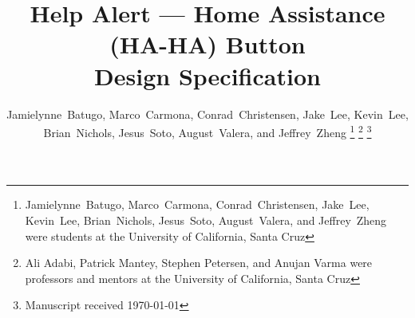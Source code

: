 \documentclass[journal,compsoc]{IEEEtran}
\begin{document}
%
\title{
  Help Alert --- Home Assistance (HA-HA) Button \\
  Design Specification
}
%
%
%

\author{Jamielynne~Batugo, Marco~Carmona, Conrad~Christensen, Jake~Lee, Kevin~Lee, Brian~Nichols, Jesus~Soto, August~Valera, and Jeffrey~Zheng%
  \thanks{Jamielynne~Batugo, Marco~Carmona, Conrad~Christensen, Jake~Lee, Kevin~Lee, Brian~Nichols, Jesus~Soto, August~Valera, and Jeffrey~Zheng were students at the University of California, Santa Cruz}%
  \thanks{Ali Adabi, Patrick Mantey, Stephen Petersen, and Anujan Varma were professors and mentors at the University of California, Santa Cruz}%
\thanks{Manuscript received \today}}

%
%
\end{document}
